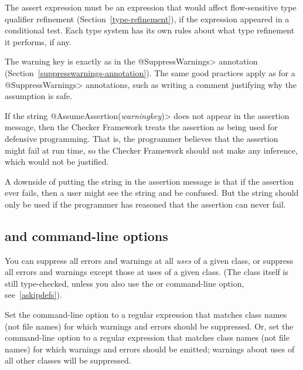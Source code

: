 The assert expression must be an expression that would affect flow-sensitive
type qualifier refinement (Section~\ref{type-refinement}), if the
expression appeared in a conditional test.  Each type system has its own
rules about what type refinement it performs, if any.

The warning key is exactly as in the \<@SuppressWarnings> annotation
(Section~\ref{suppresswarnings-annotation}).  The same good practices apply
as for a \<@SuppressWarnings> annotations, such as writing a comment
justifying why the assumption is safe.

If the string \<@AssumeAssertion(\emph{warningkey})> does not appear in the
assertion message, then the Checker Framework treats the assertion as
being used for defensive programming.  That is, the programmer believes
that the assertion might fail at run time, so the Checker Framework should
not make any inference, which would not be justified.

A downside of putting the string in the assertion message is that if the
assertion ever fails, then a user might see the string and be confused.
But the string should only be used if the programmer has reasoned that the
assertion can never fail.



\subsection{ and  command-line options\label{askipuses}}

You can suppress all errors and warnings at all \emph{uses} of a given
class, or suppress all errors and warnings except those at uses of a given
class.  (The class itself is still type-checked, unless you also use
the  or  command-line option, see~\ref{askipdefs}).

Set the  command-line option to a
regular expression that matches class names (not file names) for which warnings and errors
should be suppressed.
Or, set the  command-line option to a
regular expression that matches class names (not file names) for which warnings and errors
should be emitted; warnings about uses of all other classes will be suppressed.

